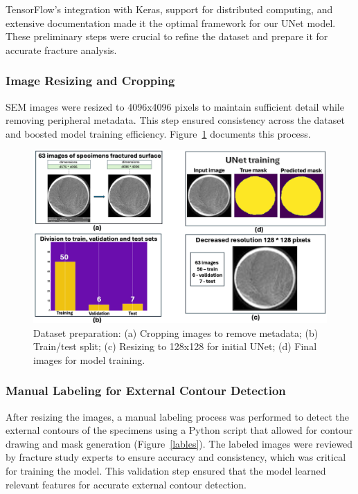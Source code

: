 \documentclass{ieeeaccess}
\begin{document}
TensorFlow's integration with Keras, support for distributed computing, and extensive documentation made it the optimal framework for our UNet model. These preliminary steps were crucial to refine the dataset and prepare it for accurate fracture analysis.

\subsubsection{Image Resizing and Cropping}
SEM images were resized to 4096x4096 pixels to maintain sufficient detail while removing peripheral metadata. This step ensured consistency across the dataset and boosted model training efficiency. Figure~\ref{steps_was_done} documents this process.

\begin{figure}[!t]
  \centering
  \includegraphics[width=1\linewidth, height=0.23\textheight]{figures/steps_dataset4.png}
  \caption{Dataset preparation: (a) Cropping images to remove metadata; (b) Train/test split; (c) Resizing to 128x128 for initial UNet; (d) Final images for model training.}
  \label{steps_was_done}
\end{figure}



\subsubsection{Manual Labeling for External Contour Detection}
After resizing the images, a manual labeling process was performed to detect the external contours of the specimens using a Python script that allowed for contour drawing and mask generation (Figure~\ref{lables}).
The labeled images were reviewed by fracture study experts to ensure accuracy and consistency, which was critical for training the model. This validation step ensured that the model learned relevant features for accurate external contour detection.
\end{document}
